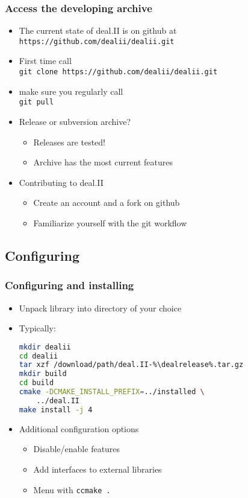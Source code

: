 \begin{frame}
  \frametitle{Access the developing archive}
  \begin{itemize}
  \item The current state of deal.II is on github at\\
    \texttt{https://github.com/dealii/dealii.git}
  \item First time call\\
    \texttt{\footnotesize git clone https://github.com/dealii/dealii.git}
  \item make sure you regularly call\\
    \texttt{git pull}
  \item Release or subversion archive?
    \begin{itemize}
    \item Releases are tested!
    \item Archive has the most current features
    \end{itemize}
    \pause
    \item Contributing to deal.II
      \begin{itemize}
      \item Create an account and a fork on github
      \item Familiarize yourself with the git workflow
      \end{itemize}
  \end{itemize}
\end{frame}

\subsection{Configuring}

\begin{frame}[fragile]
  \frametitle{Configuring and installing}
  \begin{itemize}
  \item Unpack library into directory of your choice
  \item Typically:
\begin{lstlisting}[language=bash,basicstyle=\ttfamily,keywordstyle=\ttfamily]
mkdir dealii
cd dealii
tar xzf /download/path/deal.II-%\dealrelease%.tar.gz
mkdir build
cd build
cmake -DCMAKE_INSTALL_PREFIX=../installed \
    ../deal.II
make install -j 4
\end{lstlisting}
\item Additional configuration options
    \begin{itemize}
    \item Disable/enable features
    \item Add interfaces to external libraries
    \item Menu with \texttt{ccmake .}
    \end{itemize}
  \end{itemize}
\end{frame}

